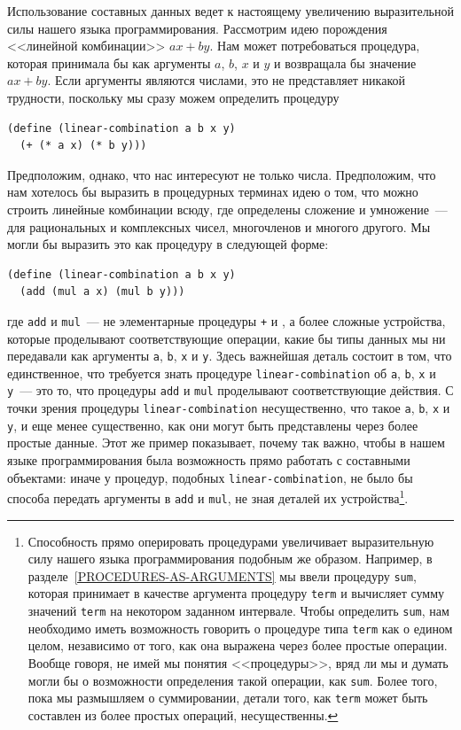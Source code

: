 Использование составных данных ведет к настоящему увеличению
выразительной силы нашего языка программирования.  Рассмотрим идею
порождения <<линейной комбинации>> $ax + by$.  Нам может
потребоваться процедура, которая принимала бы как аргументы
$a$, $b$, $x$ и $y$ и
возвращала бы значение $ax + by$.  Если аргументы являются
числами, это не представляет никакой трудности, поскольку мы сразу
можем определить процедуру

\begin{Verbatim}[fontsize=\small]
(define (linear-combination a b x y) 
  (+ (* a x) (* b y)))
\end{Verbatim}

Предположим, однако, что нас интересуют не только числа.  Предположим,
что нам хотелось бы выразить в процедурных терминах идею о том, что
можно строить линейные комбинации всюду, где определены сложение и
умножение~--- для рациональных и комплексных чисел, многочленов и
многого другого.  Мы могли бы выразить это как процедуру в следующей форме:

\begin{Verbatim}[fontsize=\small]
(define (linear-combination a b x y)
  (add (mul a x) (mul b y)))
\end{Verbatim}
где {\tt add} и {\tt mul}~--- не элементарные процедуры
{\tt +} и {\tt *}, а более сложные устройства, которые
проделывают соответствующие операции, какие бы типы данных мы ни
передавали как аргументы {\tt a}, {\tt b},
{\tt x} и {\tt y}.  Здесь важнейшая деталь состоит в
том, что единственное, что требуется знать процедуре
{\tt linear-combination} об {\tt a}, {\tt b},
{\tt x} и {\tt y}~--- это то, что процедуры
{\tt add} и {\tt mul} проделывают соответствующие
действия.  С точки зрения процедуры
{\tt linear-combination} несущественно, что такое
{\tt a}, {\tt b}, {\tt x} и {\tt y}, и еще 
менее существенно, как они могут быть представлены через более
простые данные.  Этот же пример показывает, почему так важно, чтобы в
нашем языке программирования была возможность прямо работать с
составными объектами: иначе у процедур, подобных
{\tt linear-combination}, не было бы способа передать аргументы
в {\tt add} и {\tt mul}, не зная деталей их устройства\footnote{Способность прямо оперировать процедурами увеличивает
выразительную силу нашего языка программирования подобным же образом.
Например, в разделе~\ref{PROCEDURES-AS-ARGUMENTS} мы
ввели процедуру {\tt sum}, которая принимает в качестве
аргумента процедуру {\tt term} и вычисляет сумму значений
{\tt term} на некотором заданном интервале. Чтобы определить
{\tt sum}, нам необходимо иметь возможность говорить о процедуре
типа {\tt term} как о едином целом, независимо от того, как она 
выражена через более простые операции.  Вообще говоря,
не имей мы понятия <<процедуры>>, вряд ли мы и думать могли бы
о возможности определения такой операции, как
{\tt sum}.  Более того, пока мы размышляем о суммировании,
детали того, как {\tt term} может быть составлен из более
простых операций, несущественны.
}.


